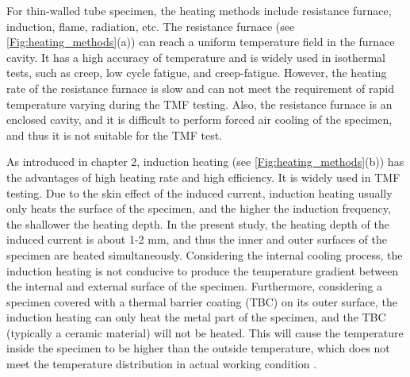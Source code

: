 For thin-walled tube specimen, the heating methods include resistance furnace, induction, flame, radiation, etc.
The resistance furnace (see \ref{Fig:heating_methods}(a)) can reach a uniform temperature field in the furnace cavity. It has a high accuracy of temperature and is widely used in isothermal tests, such as creep, low cycle fatigue, and creep-fatigue. However, the heating rate of the resistance furnace is slow and can not meet the requirement of rapid temperature varying during the TMF testing. Also, the resistance furnace is an enclosed cavity, and it is difficult to perform forced air cooling of the specimen, and thus it is not suitable for the TMF test.


As introduced in chapter 2, induction heating (see \ref{Fig:heating_methods}(b)) has the advantages of high heating rate and high efficiency. It is widely used in TMF testing.
Due to the skin effect of the induced current, induction heating usually only heats the surface of the specimen, and the higher the induction frequency, the shallower the heating depth.
In the present study, the heating depth of the induced current is about 1-2 mm, and thus the inner and outer surfaces of the specimen are heated simultaneously.
Considering the internal cooling process, the induction heating is not conducive to produce the temperature gradient between the internal and external surface of the specimen. Furthermore, considering a specimen covered with a thermal barrier coating (TBC) on its outer surface, the induction heating can only heat the metal part of the specimen, and the TBC (typically a ceramic material) will not be heated. This will cause the temperature inside the specimen to be higher than the outside temperature, which does not meet the temperature distribution in actual working condition \cite{BRENDEL2008234}.

